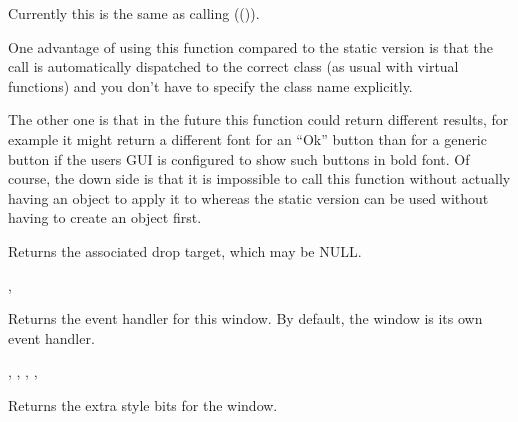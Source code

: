 
Currently this is the same as calling
(()).

One advantage of using this function compared to the static version is that
the call is automatically dispatched to the correct class (as usual with
virtual functions) and you don't have to specify the class name explicitly.

The other one is that in the future this function could return different
results, for example it might return a different font for an ``Ok'' button
than for a generic button if the users GUI is configured to show such buttons
in bold font. Of course, the down side is that it is impossible to call this
function without actually having an object to apply it to whereas the static
version can be used without having to create an object first.


\label{wxwindowgetdroptarget}


Returns the associated drop target, which may be NULL.


,


\label{wxwindowgeteventhandler}


Returns the event handler for this window. By default, the window is its
own event handler.


,\rtfsp
{},\rtfsp
{},\rtfsp
{},\rtfsp
{}\rtfsp


\label{wxwindowgetextrastyle}


Returns the extra style bits for the window.


